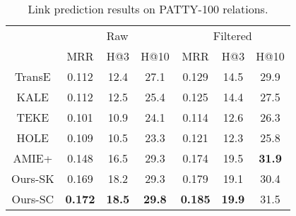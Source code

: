 \begin{table}[b]
	\small
	\centering
	\caption{Link prediction results on PATTY-100 relations.}
	\label{tab:link-pred-patty}
	\begin{tabular}{|c|ccc|ccc|}
		\hline
				&	\multicolumn{3}{c|}{Raw}
				&	\multicolumn{3}{c|}{Filtered}	\\
		\cline{2-7}	
				&	MRR	&	H@3	&	H@10
				&	MRR	&	H@3	&	H@10		\\
		\hline
		TransE
				&	0.112	&	12.4	&	27.1
				&	0.129	&	14.5	&	29.9	\\	%
		KALE
				&	0.112	&	12.5	&	25.4
				&	0.125	&	14.4	&	27.5	\\	%
		TEKE
				&	0.101	&	10.9	&	24.1
				&	0.114	&	12.6	&	26.3	\\
		HOLE
				&	0.109	&	10.5	&	23.3
				&	0.121	& 	12.3	&	25.8	\\	%
		AMIE+
				&	0.148	&	16.5	&	29.3
				&	0.174	&	19.5	&	\textbf{31.9}	\\
		\hline
		Ours-SK
				&	0.169	&	18.2	&	29.3
				&	0.179	&	19.1	&	30.4	\\		%
		Ours-SC
				&	\textbf{0.172}		&	\textbf{18.5}	&	\textbf{29.8}
				&	\textbf{0.185}		&	\textbf{19.9}	&	31.5	\\	%
		\hline
	\end{tabular}
\end{table}

